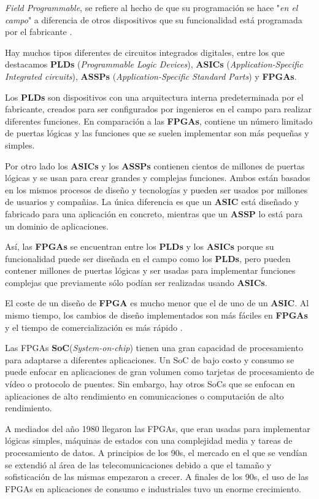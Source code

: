 \textit{Field Programmable}, se refiere al hecho de que su programación se hace "\textit{en el campo}" a diferencia de otros dispositivos 
que su funcionalidad está programada por el fabricante \cite{maxfield1}.

Hay muchos tipos diferentes de circuitos integrados digitales, entre los que destacamos \textbf{PLDs} (\textit{Programmable Logic Devices}), 
\textbf{ASICs} (\textit{Application-Specific Integrated circuits}), \textbf{ASSPs} (\textit{Application-Specific Standard Parts}) y \textbf{FPGAs}.

Los \textbf{PLDs} son dispositivos con una arquitectura interna predeterminada por el fabricante, creados para ser configurados por 
ingenieros en el campo para realizar diferentes funciones. En comparación a las \textbf{FPGAs}, contiene un número limitado de puertas lógicas 
y las funciones que se suelen implementar son más pequeñas y simples.

Por otro lado los \textbf{ASICs} y los \textbf{ASSPs} contienen cientos de millones de puertas lógicas y se usan para crear grandes y complejas 
funciones. Ambos están basados en los mismos procesos de diseño y tecnologías y pueden ser usados por millones de usuarios y compañias. La 
única diferencia es que un \textbf{ASIC} está diseñado y fabricado para una aplicación en concreto, mientras que un \textbf{ASSP} lo está 
para un dominio de aplicaciones.

Así, las \textbf{FPGAs} se encuentran entre los \textbf{PLDs} y los \textbf{ASICs} porque su funcionalidad puede ser diseñada en el campo como 
los \textbf{PLDs}, pero pueden contener millones de puertas lógicas y ser usadas para implementar funciones complejas que previamente sólo 
podían ser realizadas usando \textbf{ASICs}. 

El coste de un diseño de \textbf{FPGA} es mucho menor que el de uno de un \textbf{ASIC}. Al mismo tiempo, los cambios de diseño implementados 
son más fáciles en \textbf{FPGAs} y el tiempo de comercialización es más rápido \cite{maxfield2}.

Las FPGAs \textbf{SoC}(\textit{System-on-chip}) tienen una gran capacidad de procesamiento para adaptarse a diferentes aplicaciones. Un SoC 
de bajo costo y consumo se puede enfocar en aplicaciones de gran volumen como tarjetas de procesamiento de vídeo o protocolo de puentes. Sin 
embargo, hay otros SoCs que se enfocan en aplicaciones de alto rendimiento en comunicaciones o computación de alto rendimiento.

A mediados del año 1980 llegaron las FPGAs, que eran usadas para implementar lógicas simples, máquinas de estados con una complejidad media 
y tareas de procesamiento de datos. A principios de los 90s, el mercado en el que se vendían se extendió al área de las telecomunicaciones 
debido a que el tamaño y sofisticación de las mismas empezaron a crecer. A finales de los 90s, el uso de las FPGAs en aplicaciones de consumo 
e industriales tuvo un enorme crecimiento.

